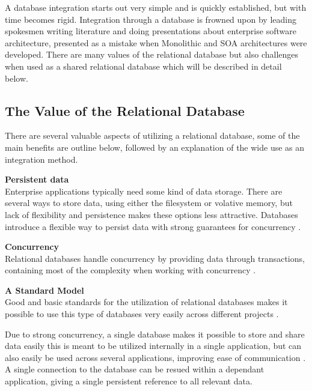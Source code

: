 A database integration starts out very simple and is quickly established, but with time becomes rigid. Integration through a database is frowned upon by leading spokesmen writing literature and doing presentations about enterprise software architecture, presented as a mistake when Monolithic and SOA architectures were developed. There are many values of the relational database but also challenges when used as a shared relational database which will be described in detail below.

\subsection{The Value of the Relational Database}
There are several valuable aspects of utilizing a relational database, some of the main benefits are outline below, followed by an explanation of the wide use as an integration method.

\textbf{Persistent data}\\
Enterprise applications typically need some kind of data storage. There are several ways to store data, using either the filesystem or volative memory, but lack of flexibility and persistence makes these options less attractive. Databases introduce a flexible way to persist data with strong guarantees for concurrency \cite[p.~3]{sadalage2012nosql}.

\textbf{Concurrency}\\
Relational databases handle concurrency by providing data through transactions, containing most of the complexity when working with concurrency \cite[p.~4]{sadalage2012nosql}. 

\textbf{A Standard Model}\\
Good and basic standards for the utilization of relational databases makes it possible to use this type of databases very easily across different projects \cite[p.~4]{sadalage2012nosql}. 

Due to strong concurrency, a single database makes it possible to store and share data easily this is meant to be utilized internally in a single application, but can also easily be used across several applications, improving ease of communication \cite[p.~4]{sadalage2012nosql}. A single connection to the database can be resued within a dependant application, giving a single persistent reference to all relevant data.



